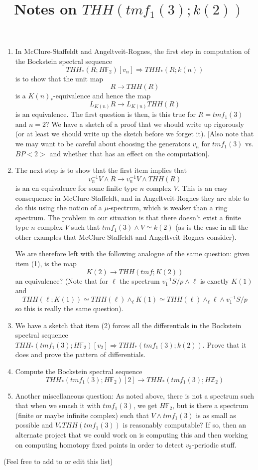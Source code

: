 \documentclass[11pt, oneside]{article}   	%
\title{Notes on $THH(tmf_1(3);k(2))$ }
\date{}							%
\begin{document}
\maketitle
\begin{enumerate}
\item In McClure-Staffeldt and Angeltveit-Rognes, the first step in computation of the Bockstein spectral sequence 
\[ THH_*(R;H\mathbb{F}_2)[v_n]\Rightarrow THH_*(R;k(n)) \]
is to show that the unit map 
\[ R\rightarrow THH(R) \]
is a $K(n)_*$-equivalence and hence the map
\[ L_{K(n)}R\rightarrow L_{K(n)}THH(R)\]
is an equivalence. The first question is then, is this true for $R=tmf_1(3)$ and $n=2$? We have a sketch of a proof that we should write up rigorously (or at least we should write up the sketch before we forget it). [Also note that we may want to be careful about choosing the generators $v_n$ for $tmf_1(3)$ vs. $BP<2>$ and whether that has an effect on the computation]. 

\item The next step is to show that the first item implies that 
\[ v_n^{-1}V\wedge R \rightarrow v_n^{-1}V\wedge THH(R)\]
is an en equivalence for some finite type $n$ complex $V$. This is an easy consequence in McClure-Staffeldt, and in Angeltveit-Rognes they are able to do this using the notion of a $\mu$-spectrum, which is weaker than a ring spectrum. The problem in our situation is that there doesn't exist a finite type $n$ complex $V$ such that $tmf_1(3)\wedge V\simeq k(2)$ (as is the case in all the other examples that McClure-Staffeldt and Angeltveit-Rognes consider). 

We are therefore left with the following analogue of the same question: given item (1), is the map 
\[ K(2)\rightarrow THH(tmf;K(2)) \]
an equivalence? (Note that for $\ell$ the spectrum $v_1^{-1}S/p\wedge \ell$ is exactly $K(1)$ and 
\[ THH(\ell;K(1))\simeq THH(\ell)\wedge_{\ell}K(1)\simeq THH(\ell)\wedge_{\ell} \ell \wedge v_1^{-1}S/p \]
so this is really the same question). 

\item We have a sketch that item (2) forces all the differentials in the Bockstein spectral sequence $THH_*(tmf_1(3);H\mathbb{F}_2)[v_2]\Rightarrow THH_*(tmf_1(3);k(2)).$ Prove that it does and prove the pattern of differentials. 

\item Compute the Bockstein spectral sequence 
\[ THH_*(tmf_1(3);H\mathbb{F}_2)[2]\rightarrow THH_*(tmf_1(3);H\mathbb{Z}_{2}) \]

\item Another miscellaneous question:  As noted above, there is not a spectrum such that when we smash it with $tmf_1(3)$, we get $H\mathbb{F}_2$, but is there a spectrum (finite or maybe infinite complex) such that $V\wedge tmf_1(3)$ is as small as possible and $V_*THH(tmf_1(3))$ is reasonably computable? If so, then an alternate project that we could work on is computing this and then working on computing homotopy fixed points in order to detect $v_3$-periodic stuff. 
\end{enumerate}
(Feel free to add to or edit this list)
\end{document}
